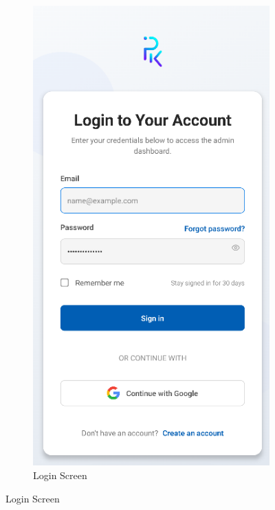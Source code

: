 \begin{figure}[htbp]
    \centering
    \begin{subfigure}[b]{0.3\textwidth}
        \centering
        \includegraphics[width=\textwidth]{images/mobile-auth-screen_login.png}
        \caption{Login Screen}

\end{subfigure}
\end{figure}
